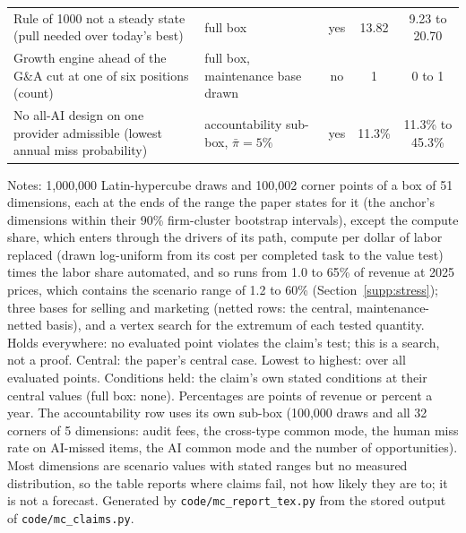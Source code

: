 \begin{table}[t]
\begin{tabular}{@{}>{\raggedright\arraybackslash}p{6.3cm}>{\raggedright\arraybackslash}p{3.3cm}ccc@{}}
Rule of 1000 not a steady state (pull needed over today's best) & full box & yes & 13.82 & 9.23 to 20.70 \\
Growth engine ahead of the G\&A cut at one of six positions (count) & full box, maintenance base drawn & no & 1 & 0 to 1 \\
No all-AI design on one provider admissible (lowest annual miss probability) & accountability sub-box, $\bar\pi=5\%$ & yes & 11.3\% & 11.3\% to 45.3\% \\
\bottomrule\end{tabular}
\par\vspace{2pt}\footnotesize\raggedright Notes: 1{,}000{,}000 Latin-hypercube draws and 100{,}002 corner points of a box of 51 dimensions, each at the ends of the range the paper states for it (the anchor's dimensions within their 90\% firm-cluster bootstrap intervals), except the compute share, which enters through the drivers of its path, compute per dollar of labor replaced (drawn log-uniform from its cost per completed task to the value test) times the labor share automated, and so runs from 1.0 to 65\% of revenue at 2025 prices, which contains the scenario range of 1.2 to 60\% (Section~\ref{supp:stress}); three bases for selling and marketing (netted rows: the central, maintenance-netted basis), and a vertex search for the extremum of each tested quantity. Holds everywhere: no evaluated point violates the claim's test; this is a search, not a proof. Central: the paper's central case. Lowest to highest: over all evaluated points. Conditions held: the claim's own stated conditions at their central values (full box: none). Percentages are points of revenue or percent a year. The accountability row uses its own sub-box (100{,}000 draws and all 32 corners of 5 dimensions: audit fees, the cross-type common mode, the human miss rate on AI-missed items, the AI common mode and the number of opportunities). Most dimensions are scenario values with stated ranges but no measured distribution, so the table reports where claims fail, not how likely they are to; it is not a forecast. Generated by \texttt{code/mc\_report\_tex.py} from the stored output of \texttt{code/mc\_claims.py}.
\end{table}
